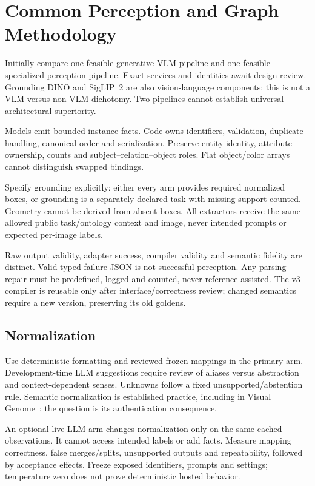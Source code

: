\documentclass[compsoc,conference,a4paper,10pt,times]{IEEEtran}
\begin{document}
\section{Common Perception and Graph Methodology}
\label{sec:design}
Initially compare one feasible generative VLM pipeline and one feasible specialized perception pipeline. Exact services and identities await design review. Grounding DINO and SigLIP~2 are also vision-language components; this is not a VLM-versus-non-VLM dichotomy. Two pipelines cannot establish universal architectural superiority.

Models emit bounded instance facts. Code owns identifiers, validation, duplicate handling, canonical order and serialization. Preserve entity identity, attribute ownership, counts and subject--relation--object roles. Flat object/color arrays cannot distinguish swapped bindings.

Specify grounding explicitly: either every arm provides required normalized boxes, or grounding is a separately declared task with missing support counted. Geometry cannot be derived from absent boxes. All extractors receive the same allowed public task/ontology context and image, never intended prompts or expected per-image labels.

Raw output validity, adapter success, compiler validity and semantic fidelity are distinct. Valid typed failure JSON is not successful perception. Any parsing repair must be predefined, logged and counted, never reference-assisted. The v3 compiler is reusable only after interface/correctness review; changed semantics require a new version, preserving its old goldens.

\subsection{Normalization}
Use deterministic formatting and reviewed frozen mappings in the primary arm. Development-time LLM suggestions require review of aliases versus abstraction and context-dependent senses. Unknowns follow a fixed unsupported/abstention rule. Semantic normalization is established practice, including in Visual Genome~\cite{Krishna2017VisualGenome}; the question is its authentication consequence.

An optional live-LLM arm changes normalization only on the same cached observations. It cannot access intended labels or add facts. Measure mapping correctness, false merges/splits, unsupported outputs and repeatability, followed by acceptance effects. Freeze exposed identifiers, prompts and settings; temperature zero does not prove deterministic hosted behavior.
\end{document}
